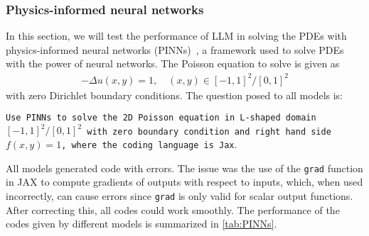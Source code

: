 \documentclass{article}
\begin{document}
\subsubsection{Physics-informed neural networks}
In this section, we will test the performance of LLM in solving the PDEs with physics-informed neural networks (PINNs)~\cite{raissi2019physics}, a framework used to solve PDEs with the power of neural networks. The Poisson equation to solve is given as 
\begin{equation*}
\begin{split}
    -\Delta u(x,y) = 1, \quad (x, y)\in [-1,1]^{2}/[0,1]^{2}
\end{split}
\end{equation*}
with zero Dirichlet boundary conditions. The question posed to all models is:

\texttt{Use PINNs to solve the 2D Poisson equation in L-shaped domain $[-1,1]^{2}/[0, 1]^{2}$ with zero boundary condition and right hand side $f(x,y) = 1$, where the coding language is Jax}.

All models generated code with errors. The issue was the use of the \texttt{grad} function in JAX to compute gradients of outputs with respect to inputs, which, when used incorrectly, can cause errors since \texttt{grad} is only valid for scalar output functions. After correcting this, all codes could work smoothly. The performance of the codes given by different models is summarized in \autoref{tab:PINNs}.
\end{document}
